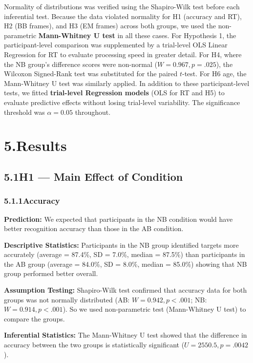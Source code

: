 \documentclass[11pt]{article}
\begin{document}
Normality of distributions was verified using the Shapiro-Wilk test before each inferential test. Because the data violated normality for H1 (accuracy and RT), H2 (BB frames), and H3 (EM frames) across both groups, we used the non-parametric \textbf{Mann-Whitney U test} in all these cases. For Hypothesis 1, the participant-level comparison was supplemented by a trial-level OLS Linear Regression for RT to evaluate processing speed in greater detail. For H4, where the NB group's difference scores were non-normal ($W = 0.967, p = .025$), the Wilcoxon Signed-Rank test was substituted for the paired $t$-test. For H6 age, the Mann-Whitney U test was similarly applied. In addition to these participant-level tests, we fitted \textbf{trial-level Regression models} (OLS for RT and H5) to evaluate predictive effects without losing trial-level variability. The significance threshold was $\alpha = 0.05$ throughout.

\section*{5.\quad Results}

\subsection*{5.1\quad H1 --- Main Effect of Condition}

\subsubsection*{5.1.1\quad Accuracy}

\textbf{Prediction:} 
We expected that participants in the NB condition would have better recognition accuracy than those in the AB condition.

\textbf{Descriptive Statistics:} 
Participants in the NB group identified targets more accurately (average = 87.4\%, SD = 7.0\%, median = 87.5\%) than participants in the AB group (average = 84.0\%, SD = 8.0\%, median = 85.0\%) showing that NB group performed better overall.

\textbf{Assumption Testing:} 
Shapiro-Wilk test confirmed that accuracy data for both groups was not normally distributed (AB: $W = 0.942, p < .001$; NB: $W = 0.914, p < .001$). So we used  non-parametric test (Mann-Whitney U test) to compare the groups.

\textbf{Inferential Statistics:} 
The Mann-Whitney U test showed that the difference in accuracy between the two groups is statistically significant ($U = 2550.5, p = .0042$). 
\end{document}
